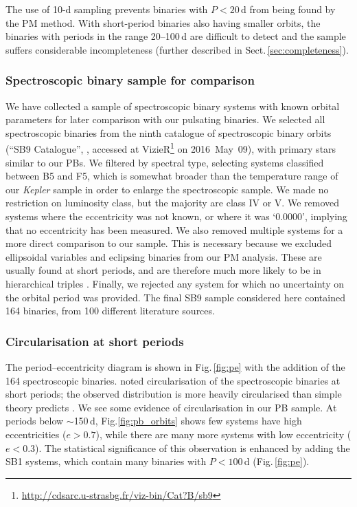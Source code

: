 \documentclass[a4paper,fleqn,usenatbib]{mnras}
\begin{document}
The use of 10-d sampling prevents binaries with $P<20$\,d from being found by the PM method. With short-period binaries also having smaller orbits, the binaries with periods in the range 20--100\,d are difficult to detect and the sample suffers considerable incompleteness (further described in Sect.\,\ref{sec:completeness}).


\subsubsection{Spectroscopic binary sample for comparison}
\label{sssec:sb9}

We have collected a sample of spectroscopic binary systems with known orbital parameters for later comparison with our pulsating binaries.
We selected all spectroscopic binaries from the ninth catalogue of spectroscopic binary orbits (``SB9 Catalogue'', \citealt{pourbaixetal2004}, accessed at VizieR\footnote{\url{http://cdsarc.u-strasbg.fr/viz-bin/Cat?B/sb9}} on 2016~May~09), with primary stars similar to our PBs. We filtered by spectral type, selecting systems classified between B5 and F5, which is somewhat broader than the temperature range of our \textit{Kepler} sample in order to enlarge the spectroscopic sample. We made no restriction on luminosity class, but the majority are class IV or V. We removed systems where the eccentricity was not known, or where it was `0.0000', implying that no eccentricity has been measured. We also removed multiple systems for a more direct comparison to our sample. This is necessary because we excluded ellipsoidal variables and eclipsing binaries from our PM analysis. These are usually found at short periods, and are therefore much more likely to be in hierarchical triples \citep{tokovininetal2006,moe&distefano2017}. Finally, we rejected any system for which no uncertainty on the orbital period was provided. The final SB9 sample considered here contained 164 binaries, from 100 different literature sources.


\subsubsection{Circularisation at short periods}
\label{sssec:circularisation}

The period--eccentricity diagram is shown in Fig.\,\ref{fig:pe} with the addition of the 164 spectroscopic binaries. \citet{pourbaixetal2004} noted circularisation of the spectroscopic binaries at short periods; the observed distribution is more heavily circularised than simple theory predicts \citep{hut1981}. We see some evidence of circularisation in our PB sample. At periods below $\sim$150\,d, Fig.\:\ref{fig:pb_orbits} shows few systems have high eccentricities ($e>0.7$), while there are many more systems with low eccentricity ($e < 0.3$). The statistical significance of this observation is enhanced by adding the SB1 systems, which contain many binaries with $P < 100$\,d (Fig.\,\ref{fig:pe}).
\end{document}
